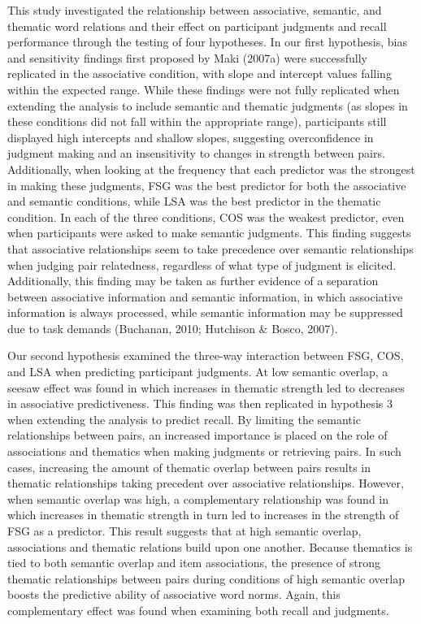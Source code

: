 \documentclass[english,man]{apa6}
\theoremstyle{definition}
\theoremstyle{definition}
\theoremstyle{definition}
\theoremstyle{remark}
\begin{document}
This study investigated the relationship between associative, semantic,
and thematic word relations and their effect on participant judgments
and recall performance through the testing of four hypotheses. In our
first hypothesis, bias and sensitivity findings first proposed by Maki
(2007a) were successfully replicated in the associative condition, with
slope and intercept values falling within the expected range. While
these findings were not fully replicated when extending the analysis to
include semantic and thematic judgments (as slopes in these conditions
did not fall within the appropriate range), participants still displayed
high intercepts and shallow slopes, suggesting overconfidence in
judgment making and an insensitivity to changes in strength between
pairs. Additionally, when looking at the frequency that each predictor
was the strongest in making these judgments, FSG was the best predictor
for both the associative and semantic conditions, while LSA was the best
predictor in the thematic condition. In each of the three conditions,
COS was the weakest predictor, even when participants were asked to make
semantic judgments. This finding suggests that associative relationships
seem to take precedence over semantic relationships when judging pair
relatedness, regardless of what type of judgment is elicited.
Additionally, this finding may be taken as further evidence of a
separation between associative information and semantic information, in
which associative information is always processed, while semantic
information may be suppressed due to task demands (Buchanan, 2010;
Hutchison \& Bosco, 2007).

Our second hypothesis examined the three-way interaction between FSG,
COS, and LSA when predicting participant judgments. At low semantic
overlap, a seesaw effect was found in which increases in thematic
strength led to decreases in associative predictiveness. This finding
was then replicated in hypothesis 3 when extending the analysis to
predict recall. By limiting the semantic relationships between pairs, an
increased importance is placed on the role of associations and thematics
when making judgments or retrieving pairs. In such cases, increasing the
amount of thematic overlap between pairs results in thematic
relationships taking precedent over associative relationships. However,
when semantic overlap was high, a complementary relationship was found
in which increases in thematic strength in turn led to increases in the
strength of FSG as a predictor. This result suggests that at high
semantic overlap, associations and thematic relations build upon one
another. Because thematics is tied to both semantic overlap and item
associations, the presence of strong thematic relationships between
pairs during conditions of high semantic overlap boosts the predictive
ability of associative word norms. Again, this complementary effect was
found when examining both recall and judgments.
\end{document}
